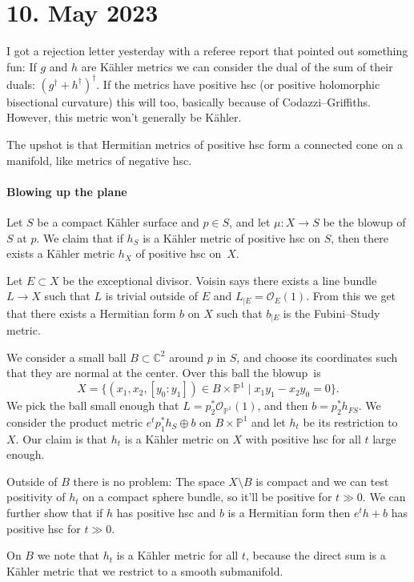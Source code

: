 \documentclass[11pt]{amsart}
\theoremstyle{definition}
\newcommand{\kk}[1]{\mathbb{#1}}
\newcommand{\cc}[1]{\mathcal{#1}}
\begin{document}
\section{10. May 2023}

I got a rejection letter yesterday with a referee report that pointed out
something fun: If $g$ and $h$ are K\"ahler metrics we can consider the dual of
the sum of their duals: $(g^\dagger + h^\dagger)^\dagger$.
If the metrics have positive hsc (or positive holomorphic bisectional curvature)
this will too, basically because of Codazzi--Griffiths.
However, this metric won't generally be K\"ahler.

The upshot is that Hermitian metrics of positive hsc form a connected cone on a
manifold, like metrics of negative hsc.

\paragraph{Blowing up the plane}

Let $S$ be a compact K\"ahler surface and $p \in S$,
and let $\mu : X \to S$ be the blowup of $S$ at $p$.
We claim that if $h_S$ is a K\"ahler metric of positive hsc on $S$,
then there exists a K\"ahler metric $h_X$ of positive hsc on~$X$.

Let $E \subset X$ be the exceptional divisor.
Voisin says there exists a line bundle $L \to X$ such that $L$ is trivial outside
of $E$ and $L_{|E} = \cc O_E(1)$.
From this we get that there exists a Hermitian form $b$ on $X$ such that
$b_{|E}$ is the Fubini--Study metric.

We consider a small ball $B \subset \kk C^2$ around $p$ in $S$,
and choose its coordinates such that they are normal at the center.
Over this ball the blowup~is%
$$
X = \{ (x_1, x_2, [y_0: y_1]) \in B \times \kk P^1
\mid x_1 y_1 - x_2 y_0 = 0 \}.
$$
We pick the ball small enough that $L = p_2^*\cc O_{\kk P^1}(1)$,
and then $b = p_2^* h_{FS}$.
We consider the product metric $e^t p_1^*h_S \oplus b$ on $B \times \kk P^1$
and let $h_t$ be its restriction to $X$.
Our claim is that $h_t$ is a K\"ahler metric on $X$ with positive hsc for all
$t$ large enough.

Outside of $B$ there is no problem:
The space $X \setminus B$ is compact and we can test positivity of $h_t$ on a
compact sphere bundle, so it'll be positive for $t \gg 0$.
We can further show that if $h$ has positive hsc and $b$ is a Hermitian form
then $e^t h + b$ has positive hsc for $t \gg 0$.

On $B$ we note that $h_t$ is a K\"ahler metric for all $t$, because the direct
sum is a K\"ahler metric that we restrict to a smooth submanifold.
\end{document}
